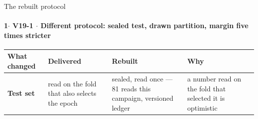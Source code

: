 \documentclass{beamer}
\begin{document}
\begin{frame}[noframenumbering]{The rebuilt protocol}
    \framesubtitle{\normalsize 1$\cdot$ \textbf{V19-1} $\cdot$ Different protocol: sealed test,
    drawn partition, margin five times stricter}
    \hypertarget{v191}{}
    \vspace{0pt}%

    {\footnotesize
    \setlength{\tabcolsep}{4pt}
    \renewcommand{\arraystretch}{1.25}%
    \begin{tabular}{@{}p{2.0cm} p{2.9cm} p{4.2cm} p{4.0cm}@{}}
        \toprule
        \textbf{What changed} & \textbf{Delivered} & \textbf{Rebuilt} & \textbf{Why} \\
        \midrule
        \textbf{Test set}
            & \raggedright read on the fold that also selects the epoch
            & \raggedright \alert{sealed, read once} --- 81 reads this campaign, versioned ledger
            & \raggedright a number read on the fold that selected it is optimistic
            \tabularnewline

\end{tabular}}
\end{frame}
\end{document}
